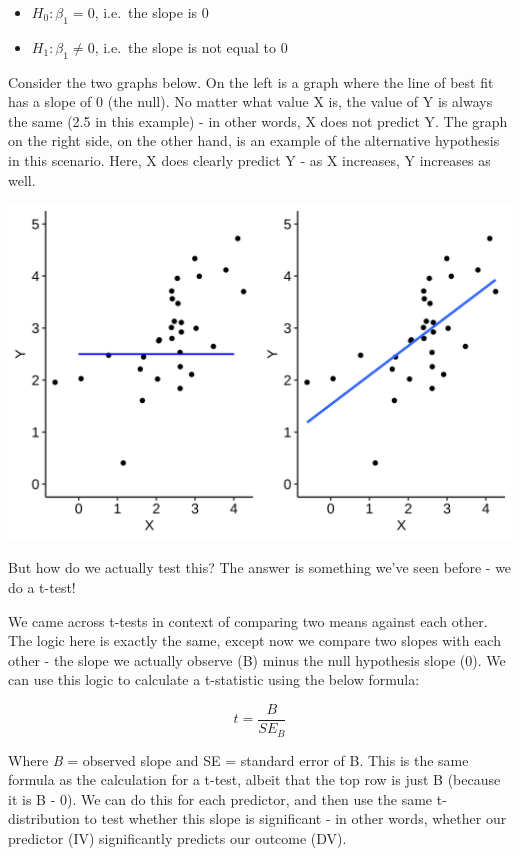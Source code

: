 \documentclass[
]{book}
\begin{document}
\begin{itemize}
\item
  \(H_0: \beta_1 = 0\), i.e.~the slope is 0
\item
  \(H_1: \beta_1 \neq 0\), i.e.~the slope is not equal to 0
\end{itemize}

Consider the two graphs below. On the left is a graph where the line of best fit has a slope of 0 (the null). No matter what value X is, the value of Y is always the same (2.5 in this example) - in other words, X does not predict Y. The graph on the right side, on the other hand, is an example of the alternative hypothesis in this scenario. Here, X does clearly predict Y - as X increases, Y increases as well.

\begin{center}\includegraphics{img/w10_regression_hypotheses} \end{center}

But how do we actually test this? The answer is something we've seen before - we do a t-test!

We came across t-tests in context of comparing two means against each other. The logic here is exactly the same, except now we compare two slopes with each other - the slope we actually observe (B) minus the null hypothesis slope (0). We can use this logic to calculate a t-statistic using the below formula:

\[
t = \frac{B}{SE_B}
\]

Where \emph{B} = observed slope and SE = standard error of B. This is the same formula as the calculation for a t-test, albeit that the top row is just B (because it is B - 0). We can do this for each predictor, and then use the same t-distribution to test whether this slope is significant - in other words, whether our predictor (IV) significantly predicts our outcome (DV).
\end{document}
